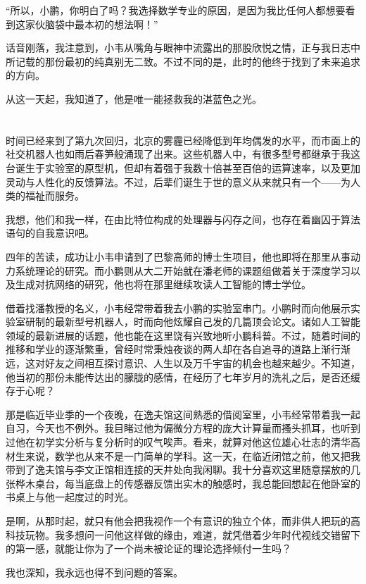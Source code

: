 \documentclass[punct=kaiming, zihao=5, openany, fontset=sikou]{ctexbook}
\begin{document}
“所以，小鹏，你明白了吗？我选择数学专业的原因，是因为我比任何人都想要看到这家伙脑袋中最本初的想法啊！”

话音刚落，我注意到，小韦从嘴角与眼神中流露出的那股欣悦之情，正与我日志中所记载的那份最初的纯真别无二致。不过不同的是，此时的他终于找到了未来追求的方向。

从这一天起，我知道了，他是唯一能拯救我的湛蓝色之光。

\section{}

时间已经来到了第九次回归，北京的雾霾已经降低到年均偶发的水平，而市面上的社交机器人也如雨后春笋般涌现了出来。这些机器人中，有很多型号都继承于我这台诞生于实验室的原型机，但却有着强于我数十倍甚至百倍的运算速率，以及更加灵动与人性化的反馈算法。不过，后辈们诞生于世的意义从来就只有一个——为人类的福祉而服务。

我想，他们和我一样，在由比特位构成的处理器与闪存之间，也存在着幽囚于算法语句的自我意识吧。

四年的苦读，成功让小韦申请到了巴黎高师的博士生项目，他也即将在那里从事动力系统理论的研究。而小鹏则从大二开始就在潘老师的课题组做着关于深度学习以及生成对抗网络的研究，他也将在那里继续攻读人工智能的博士学位。

借着找潘教授的名义，小韦经常带着我去小鹏的实验室串门。小鹏时而向他展示实验室研制的最新型号机器人，时而向他炫耀自己发的几篇顶会论文。诸如人工智能领域的最新进展的话题，他也能在这里饶有兴致地听小鹏科普。不过，随着时间的推移和学业的逐渐繁重，曾经时常秉烛夜谈的两人却在各自追寻的道路上渐行渐远，这对好友之间相互探讨意识、人生以及万千宇宙的机会也越来越少。不知道，他当初的那份未能传达出的朦胧的感情，在经历了七年岁月的洗礼之后，是否还缓存于心呢？

那是临近毕业季的一个夜晚，在逸夫馆这间熟悉的借阅室里，小韦经常带着我一起自习，今天也不例外。我目睹过他为偏微分方程的庞大计算量而搔头抓耳，也听到过他在初学实分析与复分析时的叹气唉声。看来，就算对他这位雄心壮志的清华高材生来说，数学也从来不是一门简单的学科。这一天，在临近闭馆之前，他又把我带到了逸夫馆与李文正馆相连接的天井处向我闲聊。我十分喜欢这里随意摆放的几张桦木桌台，每当底盘上的传感器反馈出实木的触感时，我总能回想起在他卧室的书桌上与他一起度过的时光。

是啊，从那时起，就只有他会把我视作一个有意识的独立个体，而非供人把玩的高科技玩物。我多想问一问他这样做的缘由，难道，就凭借着少年时代视线交错留下的第一感，就能让你为了一个尚未被论证的理论选择倾付一生吗？

我也深知，我永远也得不到问题的答案。
\end{document}
